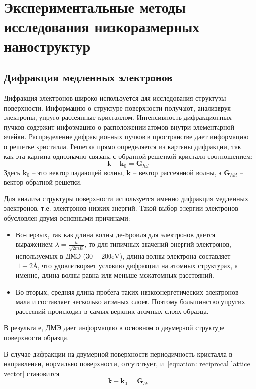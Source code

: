 \chapter{Экспериментальные методы исследования низкоразмерных наноструктур} \label{chapt2}

\section{Дифракция медленных электронов}
Дифракция электронов широко используется для исследования структуры 
поверхности. Информацию о структуре поверхности получают, анализируя
электроны, упруго рассеянные кристаллом. Интенсивность дифракционных
пучков содержит информацию о расположении атомов внутри элементарной 
ячейки. Распределение дифракционных пучков в пространстве дает 
информацию о решетке кристалла. Решетка прямо определяется из картины 
дифракции, так как эта картина однозначно связана с обратной решеткой
кристалл соотношением:
\begin{equation} \label{equation: reciprocal lattice vector}
	\textbf{k}-\textbf{k}_0 = \textbf{G}_{hkl}
\end{equation}
Здесь $\textbf{k}_0$ -- это вектор падающей волны, $\textbf{k}$ -- вектор
рассеянной волны, а $\textbf{G}_{hkl}$ -- вектор обратной решетки.


Для анализа структуры поверхности используется именно дифракция медленных
электронов, т.е. электронов низких энергий. Такой выбор энергии 
электронов обусловлен двумя основными причинами:
\vspace{15pt}
\begin{itemize}
	\item Во-первых, так как длина волны де-Бройля для электронов дается
	выражением $\lambda = \frac{h}{\sqrt{2mE}}$, то для типичных значений
	энергий электронов, используемых в ДМЭ ($30-200\si{\eV}$), длина 
	волны электрона составляет $~1-2\si{\angstrom}$, что удовлетворяет
	условию дифракции на атомных структурах, а именно, длина волны равна 
	или меньше межатомных расстояний.
	\item Во-вторых, средняя длина пробега таких низкоэнергетических
	электронов мала и составляет несколько атомных слоев. Поэтому 
	большинство упругих рассеяний происходит в самых верхних атомных
	слоях образца.
\end{itemize}
\vspace{15pt}
В результате, ДМЭ дает информацию в основном о двумерной структуре 
поверхности образца.


В случае дифракции на двумерной поверхности периодичность кристалла
в направлении, нормально поверхности, отсутствует, и~\ref{equation: reciprocal lattice vector}
становится
\begin{equation}
	\textbf{k}-\textbf{k}_0 = \textbf{G}_{hk}
\end{equation}


